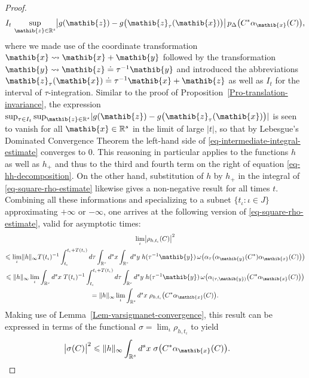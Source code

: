 \documentclass[11pt,twoside,openright]{report}
\theoremstyle{definition}
\theoremstyle{plain}
\theoremstyle{remark}
\theoremstyle{assumption}
\newcommand{\bset}[1]{\bigl\{ #1 \bigr\}}
\newcommand{\abs}[1]{\lvert #1 \rvert}
\newcommand{\babs}[1]{\bigl\lvert #1 \bigr\rvert}
\newcommand{\norm}[1]{\lVert #1 \rVert}
\newcommand{\bpDx}[1]{p_\Delta \bigl( #1 \bigr)}
\newcommand{\xib}{\mathib{x}}
\newcommand{\yib}{\mathib{y}}
\newcommand{\zib}{\mathib{z}}
\newcommand{\Rs}{\mathbb{R}^s}
\newcommand{\aibx}{\alpha_\mathib{x}}
\newcommand{\aiby}{\alpha_\mathib{y}}
\begin{document}
\begin{proof}
\begin{multline}
{      I_t} \, \sup_{\zib \in \Rs} \babs{g ( \zib ) - g \bigl(
      \zib_\tau ( \xib ) \bigr)} \, \bpDx{C^* \aibx ( C )} \text{,}
  \end{multline}
  where we made use of the coordinate transformation $\xib
  \rightsquigarrow \xib + \yib$ followed by the transformation $\yib
  \rightsquigarrow \zib \doteq \tau^{-1} \yib$ and introduced the
  abbreviations $\zib_\tau ( \xib ) \doteq \tau^{-1} \xib + \zib$ as
  well as $I_t$ for the interval of $\tau$-integration. Similar to the
  proof of Proposition~\ref{Pro-translation-invariance}, the
  expression $\sup_{\tau \in I_t} \sup_{\zib \in \Rs} \abs{g ( \zib )
  - g \bigl( \zib_\tau ( \xib ) \bigr)}$ is seen to vanish for all
  $\xib \in \Rs$ in the limit of large $\abs{t}$, so that by
  Lebesgue's Dominated Convergence Theorem the left-hand side of
  \eqref{eq-intermediate-integral-estimate} converges to 0. This
  reasoning in particular applies to the functions $h$ as well as
  $h_+$ and thus to the third and fourth term on the right of equation
  \eqref{eq-hh-decomposition}. On the other hand, substitution of $h$
  by $h_+$ in the integral of \eqref{eq-square-rho-estimate} likewise
  gives a non-negative result for all times $t$. Combining all these
  informations and specializing to a subnet $\bset{t_\iota : \iota \in
  J}$ approximating $+ \infty$ or $- \infty$, one arrives at the
  following version of \eqref{eq-square-rho-estimate}, valid for
  asymptotic times:
  \begin{multline*}
    \lim_\iota \babs{\rho_{h , t_\iota} ( C )}^2 \\
    \leqslant \lim_\iota \norm{h}_\infty T ( t_\iota)^{-1}
    \int_{t_\iota}^{t_\iota + T( t_\iota )} d \tau \int_{\Rs} d^s x
    \int_{\Rs} d^s y \; h ( \tau^{-1} \yib ) \, \omega \bigl(
    \alpha_\tau \bigl( \aiby ( C^* ) \aibx ( C ) \bigr) \bigr) \\
    \leqslant \norm{h}_\infty \lim_\iota \int_{\Rs} d^s x \; T (
    t_\iota )^{-1} \int_{t_\iota}^{t_\iota + T ( t_\iota )} d \tau
    \int_{\Rs} d^s y \; h ( \tau^{-1} \yib ) \, \omega \bigl(
    \alpha_{( \tau , \yib )} \bigl( C^* \aibx ( C ) \bigr) \bigr) \\
    = \norm{h}_\infty \lim_\iota \int_{\Rs} d^s x \; \rho_{h ,
    t_\iota} \bigl( C^* \aibx ( C ) \bigr) \text{.}
  \end{multline*}
  Making use of Lemma~\ref{Lem-varsigmanet-convergence}, this result
  can be expressed in terms of the functional $\sigma = \lim_\iota
  \rho_{h , t_\iota}$ to yield
  \begin{equation*}
    \babs{\sigma ( C )}^2 \leqslant \norm{h}_\infty \int_{\Rs} d^s x
    \; \sigma \bigl( C^* \aibx ( C ) \bigr) \text{.} \tag*{\qed}
  \end{equation*}
  \renewcommand{\qed}{}
\end{proof}
\end{document}
